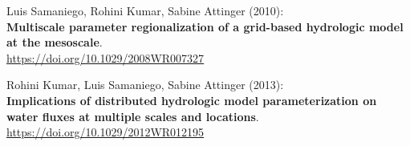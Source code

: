 \documentclass[10pt,letterpaper]{article}
\begin{document}
\begin{thebibliography}{10}
 Luis Samaniego, Rohini Kumar, Sabine Attinger
(2010):\\
\textbf{Multiscale parameter regionalization of a grid-based hydrologic
model at the mesoscale}.\\
\url{https://doi.org/10.1029/2008WR007327}

 Rohini Kumar, Luis Samaniego, Sabine Attinger (2013):\\
\textbf{Implications of distributed hydrologic model parameterization on
water fluxes at multiple scales and locations}.\\
\url{https://doi.org/10.1029/2012WR012195}



\end{thebibliography}
\end{document}
